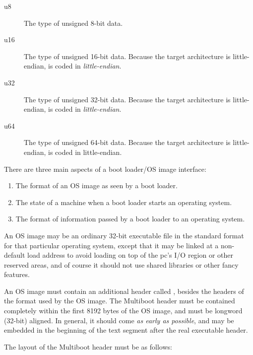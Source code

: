 \begin{description}
\item[u8]
The type of unsigned 8-bit data. 

\item[u16]
The type of unsigned 16-bit data. Because the target architecture is
little-endian,  is coded in \emph{little-endian}.

\item[u32]
The type of unsigned 32-bit data. Because the target architecture is
little-endian,  is coded in \emph{little-endian}.

\item[u64]
The type of unsigned 64-bit data. Because the target architecture is
little-endian,  is coded in little-endian.

\end{description}

\secdown

There are three main aspects of a boot loader/OS image interface:

\begin{enumerate}[nosep]
  \item 
The format of an OS image as seen by a boot loader.
  \item 
The state of a machine when a boot loader starts an operating system.
  \item 
The format of information passed by a boot loader to an operating system.
\end{enumerate}

\secdown

An OS image may be an ordinary 32-bit executable file in the standard format for
that particular operating system, except that it may be linked at a non-default
load address to avoid loading on top of the pc's I/O region or other reserved
areas, and of course it should not use shared libraries or other fancy features.

An OS image must contain an additional header called ,
besides the headers of the format used by the OS image. The Multiboot header
must be contained completely within the first 8192 bytes of the OS image, and
must be longword (32-bit) aligned. In general, it should come \emph{as early as
possible}, and may be embedded in the beginning of the text segment after the
real executable header.

\label{mbheader}

The layout of the Multiboot header must be as follows:

